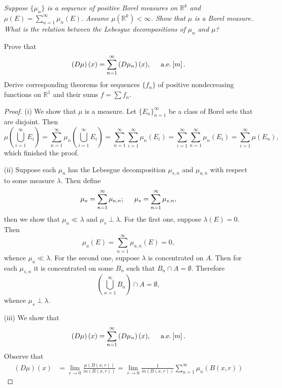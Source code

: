 \begin{problem}\em
Suppose $\{\mu_n\}$ is a sequence of positive Borel measures on $\mathbb{R}^k$ and $\mu(E)=\sum_{n=1}^\infty\mu_n(E)$. Assume $\mu(\mathbb{R}^k)<\infty$. Show that $\mu$ is a Borel measure. What is the relation between the Lebesgue decompositions of $\mu_n$ and $\mu$?\par
Prove that 
$$
\left( D\mu \right) \left( x \right) =\sum_{n=1}^{\infty}{\left( D\mu _n \right) \left( x \right)},\hspace{0.5cm}\mathrm{a}.\mathrm{e}. \left[ m \right] .
$$
Derive corresponding theorems for sequences $\{f_n\}$ of positive nondecreasing functions on $\mathbb{R}^1$ and their sums $f=\sum f_n$.
\end{problem}
\begin{proof}
(i) We show that $\mu$ is a measure. Let $\{E_n\}_{n=1}^\infty$ be a class of Borel sets that are disjoint. Then 
$$
\mu \left( \bigcup_{i=1}^{\infty}{E_i} \right) =\sum_{n=1}^{\infty}{\mu _n\left( \bigcup_{i=1}^{\infty}{E_i} \right)}=\sum_{n=1}^{\infty}{\sum_{i=1}^{\infty}{\mu _n\left( E_i \right)}}=\sum_{i=1}^{\infty}{\sum_{n=1}^{\infty}{\mu _n\left( E_i \right)}}=\sum_{i=1}^{\infty}{\mu \left( E_n \right)},
$$
which finished the proof.\par
(ii) Suppose each $\mu_n$ has the Lebesgue decomposition $\mu_{s,n}$ and $\mu_{a,n}$ with respect to some measure $\lambda$. Then define 
$$
\mu _a=\sum_{n=1}^{\infty}{\mu _{a,n}};\hspace{0.5cm}\mu _s=\sum_{n=1}^{\infty}{\mu _{s,n}},
$$
then we show that $\mu_a\ll\lambda$ and $\mu_s\perp\lambda$. For the first one, suppose $\lambda(E)=0$. Then 
$$
\mu _a\left( E \right) =\sum_{n=1}^{\infty}{\mu _{a,n}\left( E \right)}=0,
$$
whence $\mu_a\ll\lambda$. For the second one, suppose $\lambda$ is concentrated on $A$. Then for each $\mu_{s,n}$ it is concentrated on some $B_n$ such that $B_n\cap A=\emptyset$. Therefore 
$$
\left( \bigcup_{n=1}^{\infty}{B_n} \right) \cap A=\emptyset ,
$$
whence $\mu_s\perp\lambda$.\par
(iii) We show that 
$$
\left( D\mu \right) \left( x \right) =\sum_{n=1}^{\infty}{\left( D\mu _n \right) \left( x \right)},\hspace{0.5cm}\mathrm{a}.\mathrm{e}. \left[ m \right] .
$$
Observe that 
$$
\begin{aligned}
\left( D\mu \right) \left( x \right) &=\lim_{r\rightarrow 0} \frac{\mu \left( B\left( x,r \right) \right)}{m\left( B\left( x,r \right) \right)}=\lim_{r\rightarrow 0} \frac{1}{m\left( B\left( x,r \right) \right)}\sum_{n=1}^{\infty}{\mu _n\left( B\left( x,r \right) \right)}

\end{aligned}$$
\end{proof}
